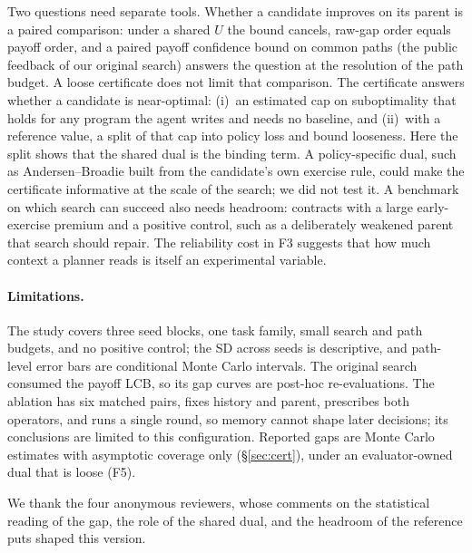 \documentclass{article}
\begin{document}
Two questions need separate tools. Whether a candidate improves on its parent is a paired comparison: under a shared $U$ the bound cancels, raw-gap order equals payoff order, and a paired payoff confidence bound on common paths (the public feedback of our original search) answers the question at the resolution of the path budget. A loose certificate does not limit that comparison. The certificate answers whether a candidate is near-optimal: (i)~an estimated cap on suboptimality that holds for any program the agent writes and needs no baseline, and (ii)~with a reference value, a split of that cap into policy loss and bound looseness. Here the split shows that the shared dual is the binding term. A policy-specific dual, such as Andersen--Broadie \citep{andersen2004primal} built from the candidate's own exercise rule, could make the certificate informative at the scale of the search; we did not test it. A benchmark on which search can succeed also needs headroom: contracts with a large early-exercise premium and a positive control, such as a deliberately weakened parent that search should repair. The reliability cost in F3 suggests that how much context a planner reads is itself an experimental variable.

\paragraph{Limitations.}
The study covers three seed blocks, one task family, small search and path budgets, and no positive control; the SD across seeds is descriptive, and path-level error bars are conditional Monte Carlo intervals. The original search consumed the payoff LCB, so its gap curves are post-hoc re-evaluations. The ablation has six matched pairs, fixes history and parent, prescribes both operators, and runs a single round, so memory cannot shape later decisions; its conclusions are limited to this configuration. Reported gaps are Monte Carlo estimates with asymptotic coverage only (\S\ref{sec:cert}), under an evaluator-owned dual that is loose (F5).

\begin{ack}
We thank the four anonymous reviewers, whose comments on the statistical reading of the gap, the role of the shared dual, and the headroom of the reference puts shaped this version.
\end{ack}




\newpage
\appendix
\setlength{\intextsep}{4pt plus 2pt minus 2pt}
\end{document}

